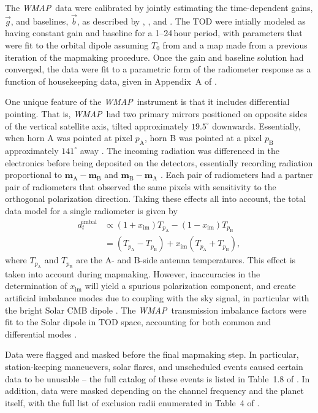 \documentclass[twocolumn]{../../common/aa}
\def\WMAP{\emph{WMAP}}
\newcommand{\A}[0]{\mathrm{A}}
\newcommand{\B}[0]{\mathrm{B}}
\newcommand{\bv}[0]{\vec{b}}
\newcommand{\g}[0]{\vec{g}}
\begin{document}
The \WMAP\ data were calibrated by jointly estimating the time-dependent gains, $\g$, and baselines, $\bv$, as described by \citet{hinshaw2007}, \citet{hinshaw2009}, and \citet{jarosik2010}.
The TOD were intially modeled as having
constant gain and baseline for a 1--24\,hour period, with parameters that were fit to the orbital
dipole assuming $T_0$ from \citet{mather:1999} and a map made from a previous
iteration of the mapmaking procedure. Once the gain and baseline solution had
converged, the data were fit to a parametric form of the radiometer response
as a function of housekeeping data, given in Appendix~A of \citet{wmapexsupp}.

One unique feature of the \WMAP\ instrument is that it includes differential pointing. That is, \WMAP\ had two primary mirrors positioned on opposite sides of the vertical satellite axis, tilted approximately $19.5^\circ$ downwards. Essentially, when horn A was pointed at pixel $p_\A$, horn B was pointed at a pixel $p_\B$ approximately $141^\circ$ away \citep{page2003:MAP}. The incoming radiation was differenced in the electronics before being deposited on the detectors, essentially recording radiation proportional to $\boldsymbol m_\A-\boldsymbol m_\B$ and $\boldsymbol m_\B-\boldsymbol m_\A$ \citep{jarosik2003:MAP}. Each pair of radiometers had a partner pair of radiometers that observed the same pixels with sensitivity to the orthogonal polarization direction. Taking these effects all into account, the total data model for a single radiometer is given by
\begin{align}
	d_t^\mathrm{imbal}&\propto (1+x_\mathrm{im})T_{p_\A}-(1-x_\mathrm{im})T_{p_\B}
	\\
	&=(T_{p_\A}-T_{p_\B})+x_\mathrm{im}(T_{p_\A}+T_{p_\B}),
\end{align}
where $T_{p_\A}$ and $T_{p_\B}$ are the A- and B-side antenna temperatures. This effect is taken into account during mapmaking. However, inaccuracies in the determination of $x_\mathrm{im}$ will yield a spurious polarization component, and create artificial imbalance modes due to coupling with the sky signal, in particular with the bright Solar CMB dipole \citep{jarosik2007}. The \WMAP\ transmission imbalance factors were fit to the Solar dipole in TOD space, accounting for both common and differential modes \citep{jarosik2003a,jarosik2007}.



Data were flagged and masked before the final mapmaking step. In particular, station-keeping maneuevers, solar flares, and unscheduled events caused certain data to be unusable -- the full catalog of these events is listed in Table~1.8 of \citet{wmapexsupp}. In addition, data were masked depending on the channel frequency and the planet itself, with the full list of exclusion radii enumerated in Table~4 of \citet{bennett2012}.
\end{document}
